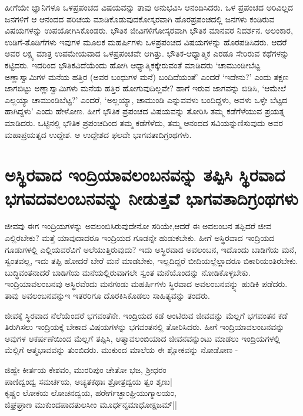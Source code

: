 ಹೀಗೆಯೇ ಜ್ಞಾನಿಗಳೂ ಒಳಪ್ರಪಂಚದ ವಿಷಯವನ್ನು ತಾವು ಅನುಭವಿಸಿ ಆನಂದಿಸಿದರು. ಒಳ ಪ್ರಪಂಚದ ಅರಿವಿಲ್ಲದ ಜನಗಳಿಗೆ ಆ ಆನಂದದ ಪರಿಚಯ ಮಾಡಿಕೊಡುವುದಕೋಸ್ಕರವಾಗಿ ಹೊರಪ್ರಪಂಚದಲ್ಲಿ ಜನಗಳು ಕಂಡಿರುವ ವಿಷಯಗಳನ್ನು ಉಪಯೋಗಿಸಿಕೊಂಡರು. ಭೌತಿಕ ಜೀವಿಗಳಿಗೋಸ್ಕರವಾಗಿ ಭೌತಿಕ ಮಾನವರ ನಿದರ್ಶನ. ಅಲಂಕಾರ, ಉಡಿಗೆ-ತೊಡಿಗೆಗಳು ಇವುಗಳ ಮೂಲಕ ಮಹರ್ಷಿಗಳು ಒಳಪ್ರಪಂಚದ ವಿಷಯಗಳನ್ನು ಹೊರಪಡಿಸಿದರು. ಆದರೆ ಅವರ ಲಕ್ಷ್ಯ ಮಾತ್ರ ಉಪಮೇಯವಾದ ಒಳಪ್ರಪಂಚವೇ ಆಗಿತ್ತು. ಭೌತಿಕ-ಆಧ್ಯಾತ್ಮಿಕ ಎರಡೂ ಸೇರಿರುವ ಕಥೆಗಳನ್ನು ಕಟ್ಟಿದರು. ಇದರಿಂದ ಭೌತಿಕವಿದೆಯೆಂದು ಹೋಗಿ ಆಧ್ಯಾತ್ಮಿಕಕ್ಕೇರುವಂತೆ ಮಾಡಿದರು `ಚಾಮುಂಡೀಬೆಟ್ಟ ಅಣ್ಣಾಸ್ವಾಮಿಗಳ ಮನೆಯ ಹತ್ತಿರ (ಅವರ ಬಂಧುಗಳ ಮನೆ) ಬಂದಿದೆಯಂತೆ' ಎಂದರೆ `ಇದೇನು?' ಎಂದು ತಕ್ಷಣ ಜಾಗಬಿಟ್ಟು ಅಣ್ಣಾಸ್ವಾಮಿಗಳು ಮನೆಯ ಹತ್ತಿರ ಹೋಗುವುದಿಲ್ಲವೇ? ಹಾಗೆ ಇರುವ ಜಾಗವನ್ನು ಬಿಡಿಸಿ, `ಆಮೇಲೆ ಎಲ್ಲಯ್ಯಾ ಚಾಮುಂಡಿಬೆಟ್ಟ?' ಎಂದರೆ, `ಅಲ್ಲಯ್ಯಾ, ಚಾಮುಂಡಿ ಎನ್ನುವವಳು ಬಂದಿದ್ದಳು, ಅವಳು ಒಳ್ಳೇ ಬೆಟ್ಟದ ಹಾಗಿದ್ದಳು' ಎಂದು ಹೇಳೋಣ. ಹೀಗೆ ಭೌತಿಕ ಪ್ರಪಂಚದ ವಿಷಯವನ್ನು ತೋರಿಸಿ ತಮ್ಮ ಕಡೆಗೆಳೆಯುವ ಪ್ರಯತ್ನ ಮಾಡಿದರು. ಒಟ್ಟಿನಲ್ಲಿ ಭೌತಿಕ ಪ್ರಪಂಚದಿಂದ ತಮ್ಮ ಕಡೆಗೆಳೆದು, ತಮ್ಮ ಆನಂದದ ಸವಿಯನ್ನುಣಿಸುವುದು ಅವರ ಮಹಾಪ್ರಯತ್ನದ ಉದ್ದೇಶ. ಆ ಉದ್ದೇಶದ ಫಲವೇ ಭಾಗವತಾದಿಗ್ರಂಥಗಳು.

\section*{ಅಸ್ಥಿರವಾದ ಇಂದ್ರಿಯಾವಲಂಬನವನ್ನು ತಪ್ಪಿಸಿ ಸ್ಥಿರವಾದ ಭಗವದವಲಂಬನವನ್ನು ನೀಡುತ್ತವೆ ಭಾಗವತಾದಿಗ್ರಂಥಗಳು}

ಜೀವವು ಈಗ ಇಂದ್ರಿಯಗಳನ್ನು ಅವಲಂಬಿಸಿರುವುದೇನೋ ಸರಿಯೇ,‌ಆದರೆ ಈ ಅವಲಂಬನ ತಪ್ಪಿದರೆ ಜೀವ ಎಲ್ಲಿರಬೇಕು? ಮತ್ತೆ ಯಾವುದಾದರೂ ಇಂದ್ರಿಯದ ಗೂಡನ್ನೇ ಹುಡುಕಬೇಕು. ಹೀಗೆ ಅಸ್ಥಿರವಾದ ಇಂದ್ರಿಯದ ಗೂಡುಗಳಲ್ಲಿ ಎಲ್ಲಿಯವರೆವಿಗೆ ಅಲೆಯುತ್ತಿರುವುದು? ಇದು ಅಸ್ಥಿರವಾದ ಅವಲಂಬನ, ಇದೊಂದು ಬಾಡಿಗೆಯ ಮನೆ, ಸ್ವಂತವಲ್ಲ, ಇದು ತಪ್ಪಿ ಹೋದರೆ ಬೇರೆ ಮನೆ ಮಾಡಬೇಕು, ಇಲ್ಲದಿದ್ದರೆ ಬೀದಿಯಲ್ಲೆಲ್ಲಾದರೂ ಬಿಕಾರಿಯಂತಿರಬೇಕು. ಬುದ್ಧಿವಂತನಾದರೆ ಬಾಡಿಗೆಯ ಮನೆಯಲ್ಲಿರುವಾಗಲೇ ಸ್ವಂತ ಮನೆಯೊಂದನ್ನು ನೋಡಿಕೊಳ್ಳಬೇಕು. ಇಂದ್ರಿಯಾವಲಂಬನವು ಅಸ್ಥಿರವೆಂದು ಮನಗಂಡು ಮಹರ್ಷಿಗಳು ಸ್ಥಿರವಾದ ಅವಲಂಬನವನ್ನ್ನು ಹುಡಿಕಿ ಪಡೆದರು. ತಾವು ಅವಲಂಬನವನ್ನುಇ ಇತರರಿಗೂ ದೊರಕಿಸಿಕೊಡಲು ಸಾಹಿತ್ಯವನ್ನು ತಂದರು.

ಜೀವಕ್ಕೆ ಸ್ಥಿರವಾದ ನೆಲೆಯೆಂದರೆ ಭಗವಂತೆನೇ. ಇಂದ್ರಿಯದ ಕಡೆ ಅಂಟಿರುವ ಜೀವವನ್ನು  ಮೆಲ್ಲಗೆ ಭಗವಂತನ ಕಡೆ ತಿರುಗಿಸಲು ಇಂದ್ರಿಯಕ್ಕೆ ಬೇಕಾದ ವಿಷಯಗಳನ್ನು ಭಗವಂತನಲ್ಲಿ ತೋರಿಸಿದರು. ಹೀಗೆ ಇಂದ್ರಿಯಾವಲಂಬನವನ್ನು  ಅವುಗಳ ಆಕರ್ಷಣೆಯಿಂದ ಮೆಲ್ಲಗೆ ತಪ್ಪಿಸಿ, ಆತ್ಮಾವಲಂಬಿಯಾದ ಜೀವನವನ್ನುಂಟು ಮಾಡಲು ಇಂದ್ರಿಯಗಳಲ್ಲಿ ಮೆಲ್ಲಿಗೆ ಆತ್ಮಭಾವವನ್ನು ತುಂಬಿದರು. ಮುಕುಂದ ಮಾಲೆಯ ಈ ಶ್ಲೋಕವನ್ನು ನೋಡೋಣ -

\begin{shloka}
ಜಿಹ್ವೇ ಕೀರ್ತಯ ಕೇಶವಂ, ಮುರರಿಪುಂ ಚೇತೋ ಭಜ, ಶ್ರೀಧರಂ\label{271}\\
ಪಾಣಿದ್ವಂದ್ವ ಸಮರ್ಚಯ, ಅಚ್ಯತಕಥಾಃ ಶ್ರೋತ್ರದ್ವಯ ತ್ವಂ ಶೃಣು|\\
ಕೃಷ್ಣಂ ಲೋಕಯ ಲೋಚನದ್ವಯ, ಹರೇರ್ಗಚ್ಛಾಂಘ್ರಿಯುಗ್ಮಾಲಯಂ,\\
ಜಿಘ್ರಘ್ರಾಣ ಮುಕುಂದಪಾದತುಲಸೀಂ ಮೂರ್ಧನ್ನಮಾಧೋಕ್ಷಜಮ್||
\end{shloka}

